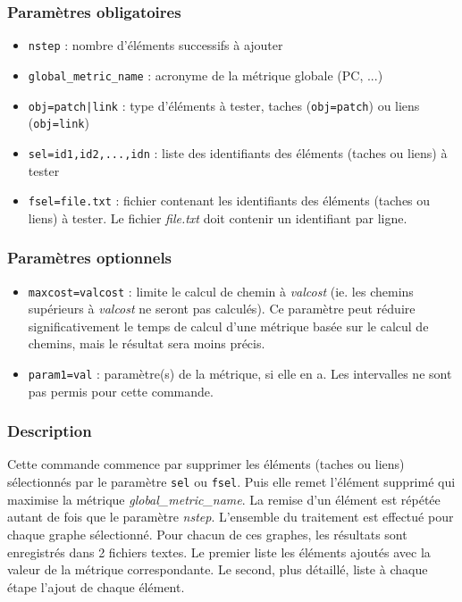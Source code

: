 \documentclass[a4paper,10pt]{report}
\begin{document}
\subsubsection{Paramètres obligatoires}
\begin{itemize}
	\item \verb|nstep| : nombre d’éléments successifs à ajouter
	\item \verb|global_metric_name| : acronyme de la métrique globale (PC, ...)
	\item \verb+obj=patch|link+ : type d'éléments à tester, taches (\verb+obj=patch+) ou liens (\verb+obj=link+)
	\item \verb|sel=id1,id2,...,idn| : liste des identifiants des éléments (taches ou liens) à tester
	\item \verb|fsel=file.txt| : fichier contenant les identifiants des éléments (taches ou liens) à tester. Le fichier \textit{file.txt} doit contenir un identifiant par ligne.
\end{itemize}

\subsubsection{Paramètres optionnels}
\begin{itemize}
	\item \verb|maxcost=valcost| : limite le calcul de chemin à \textit{valcost} (ie. les chemins supérieurs à \textit{valcost} ne seront pas calculés). Ce paramètre peut réduire significativement le temps de calcul d'une métrique basée sur le calcul de chemins, mais le résultat sera moins précis.
	\item \verb|param1=val| : paramètre(s) de la métrique, si elle en a. Les intervalles ne sont pas permis pour cette commande.
\end{itemize}

\subsubsection{Description}
Cette commande commence par supprimer les éléments (taches ou liens) sélectionnés par le paramètre \verb|sel| ou \verb|fsel|. Puis elle remet l'élément supprimé qui maximise la métrique \textit{global\_metric\_name}. La remise d'un élément est répétée autant de fois que le paramètre \textit{nstep}.
L'ensemble du traitement est effectué pour chaque graphe sélectionné. Pour chacun de ces graphes, les résultats sont enregistrés dans 2 fichiers textes. Le premier liste les éléments ajoutés avec la valeur de la métrique correspondante. Le second, plus détaillé, liste à chaque étape l'ajout de chaque élément.
\end{document}
